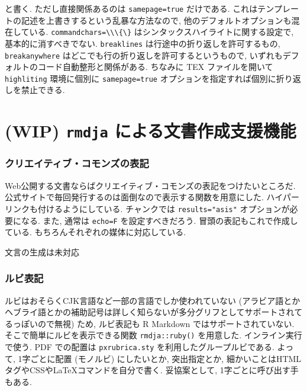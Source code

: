 \documentclass[
]{bxjsbook}
\theoremstyle{definition}
\theoremstyle{definition}
\theoremstyle{definition}
\theoremstyle{remark}
\begin{document}
と書く. ただし直接関係あるのは \texttt{samepage=true} だけである.
これはテンプレートの記述を上書きするという乱暴な方法なので,
他のデフォルトオプションも混在している.
\texttt{commandchars=\textbackslash{}\textbackslash{}\textbackslash{}\{\textbackslash{}\}}
はシンタックスハイライトに関する設定で, 基本的に消すべきでない.
\texttt{breaklines} は行途中の折り返しを許可するもの,
\texttt{breakanywhere} はどこでも行の折り返しを許可するというもので,
いずれもデフォルトのコード自動整形と関係がある. ちなみに TEX
ファイルを開いて \texttt{highliting} 環境に個別に \texttt{samepage=true}
オプションを指定すれば個別に折り返しを禁止できる.

\hypertarget{wip-rmdja-ux306bux3088ux308bux6587ux66f8ux4f5cux6210ux652fux63f4ux6a5fux80fd}{%
\chapter{\texorpdfstring{(WIP) \texttt{rmdja}
による文書作成支援機能}{(WIP) rmdja による文書作成支援機能}}\label{wip-rmdja-ux306bux3088ux308bux6587ux66f8ux4f5cux6210ux652fux63f4ux6a5fux80fd}}

\hypertarget{ux30afux30eaux30a8ux30a4ux30c6ux30a3ux30d6ux30b3ux30e2ux30f3ux30baux306eux8868ux8a18}{%
\subsection{クリエイティブ・コモンズの表記}\label{ux30afux30eaux30a8ux30a4ux30c6ux30a3ux30d6ux30b3ux30e2ux30f3ux30baux306eux8868ux8a18}}

Web公開する文書ならばクリエイティブ・コモンズの表記をつけたいところだ.
公式サイトで毎回発行するのは面倒なので表示する関数を用意にした.
ハイパーリンクも付けるようにしている. チャンクでは
\texttt{results="asis"} オプションが必要になる. また, 通常は
\texttt{echo=F} を設定すべきだろう. 冒頭の表記もこれで作成している.
もちろんそれぞれの媒体に対応している.

文言の生成は未対応

\hypertarget{ux30ebux30d3ux8868ux8a18}{%
\subsection{ルビ表記}\label{ux30ebux30d3ux8868ux8a18}}

ルビはおそらくCJK言語など一部の言語でしか使われていない
(アラビア語とかヘブライ語とかの補助記号は詳しく知らないが多分グリフとしてサポートされてるっぽいので無視)
ため, ルビ表記も R Markdown ではサポートされていない.
そこで簡単にルビを表示できる関数 \texttt{rmdja::ruby()} を用意した.
インライン実行で使う. PDF での配置は \texttt{pxrubrica.sty}
を利用したグループルビである. よって, 1字ごとに配置 (モノルビ)
にしたいとか, 突出指定とか,
細かいことはHTMLタグやCSSやLaTeXコマンドを自分で書く. 妥協案として,
1字ごとに呼び出す手もある.
\end{document}
